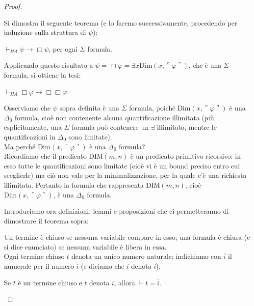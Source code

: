 \begin{proof}
\begin{description}
\noindent Si dimostra il seguente teorema (e lo faremo successivamente, procedendo per induzione sulla struttura di $\psi$):
\begin{center}
$\vdash_{HA}\psi\to\Box\psi$, per ogni $\Sigma$ formula.
\end{center}
 
\noindent Applicando questo risultato a $\psi=\Box\varphi=\exists x\ensuremath{\mathrm{Dim}}(x,\ulcorner\varphi\urcorner)$, che è una $\Sigma$ formula, si ottiene la tesi:
\begin{center}
$\vdash_{HA} \Box\varphi \rightarrow \Box\Box\varphi$.
\end{center}

\noindent Osserviamo che $\psi$ sopra definita è una $\Sigma$ formula, poiché $\ensuremath{\mathrm{Dim}}(x,\ulcorner\varphi\urcorner)$ è una $\Delta_0$ formula, cioè non contenente alcuna quantificazione illimitata (più esplicitamente, una $\Sigma$ formula può contenere un $\exists$ illimitato, mentre le quantificazioni in $\Delta_0$ sono limitate).\\
Ma perché $\ensuremath{\mathrm{Dim}}(x,\ulcorner\varphi\urcorner)$ è una $\Delta_0$ formula?\\
Ricordiamo che il predicato $\ensuremath{\mathrm{DIM}}(m,n)$ è un predicato primitivo ricorsivo: in esso tutte le quantificazioni sono limitate (cioè vi è un bound preciso entro cui sceglierle) ma ciò non vale per la minimalizzazione, per la quale c'è una richiesta illimitata. Pertanto la formula che rappresenta $\ensuremath{\mathrm{DIM}}(m,n)$, cioè $\ensuremath{\mathrm{Dim}}(x,\ulcorner\varphi\urcorner)$, è una $\Delta_0$ formula.

Introduciamo ora definizioni, lemmi e proposizioni che ci per\-met\-te\-ran\-no di dimostrare il teorema sopra:

\begin{defi}
Un termine è chiuso se nessuna variabile compare in esso; una formula è chiusa (e si dice enunciato) se nessuna variabile è libera in essa.\\
Ogni termine chiuso $t$ denota un unico numero naturale; indichiamo con $\overline i$ il numerale per il numero $i$ (e diciamo che $\overline i$ denota $i$).\\
\end{defi}

\begin{lem}
Se $t$ è un termine chiuso e $t$ denota $i$, allora $\vdash t=\overline i$.
\end{lem}


\end{description}
\end{proof}
